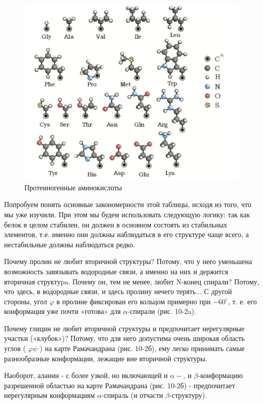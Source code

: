 \documentclass[
11pt,%
tightenlines,%
twoside,%
onecolumn,%
nofloats,%
nobibnotes,%
nofootinbib,%
superscriptaddress,%
noshowpacs,%
centertags]%
{revtex4}
\begin{document}
\begin{figure}
	\centering
	\includegraphics[scale=0.3]{amin}
	\caption{Протеиногенные аминокислоты}
\end{figure}

Попробуем понять основные закономерности этой таблицы, исходя из того, что мы уже изучили. При этом мы будем использовать следующую логику: так как белок в целом стабилен, он должен в основном состоять из стабильных элементов, т.е. именно они должны наблюдаться в его структуре чаще всего, а нестабильные должны наблюдаться редко.

Почему пролин не любит вторичной структуры? Потому, что у него уменьшена возможность завязывать водородные связи, а именно на них и держится вторичная структуpa. Почему он, тем не менее, любит N-конец спирали? Потому, что здесь, в водородные связи, и здесь пролину нечего терять... С другой стороны, угол $\varphi$ в пролине фиксирован его кольцом примерно при $-60^{\circ}$, т. е. его конформация уже почти «готова» для $\alpha$-спирали (рис. 10-2a).


Почему глицин не любит вторичной структуры и предпочитает нерегулярные участки («клубок»)? Потому, что для него допустима очень широкая область углов ( $\varphi \psi$ ) на карте Рамачандрана (рис. 10-2б), ему легко принимать самые разнообразные конформации, лежащие вне вторичной структуры.


Наоборот, аланин - с более узкой, но включающей и $\alpha-$, и $\beta$-конформацию разрешенной областью на карте Рамачандрана (рис. 10-2б) - предпочитает нерегулярным конформациям $\alpha$-спираль (и отчасти $\beta$-структуру).
\end{document}
